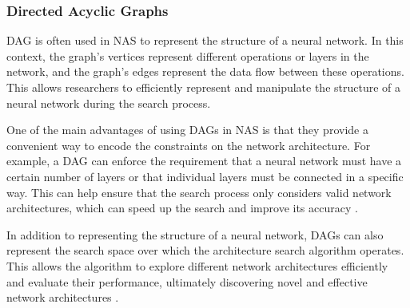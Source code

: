 \subsubsection{Directed Acyclic Graphs}
\Gls{DAG} is often used in \gls{NAS} to represent the structure of a neural network. In this context, the graph's vertices represent different operations or layers in the network, and the graph's edges represent the data flow between these operations. This allows researchers to efficiently represent and manipulate the structure of a neural network during the search process.

One of the main advantages of using \glspl{DAG} in \gls{NAS} is that they provide a convenient way to encode the constraints on the network architecture. For example, a \gls{DAG} can enforce the requirement that a neural network must have a certain number of layers or that individual layers must be connected in a specific way. This can help ensure that the search process only considers valid network architectures, which can speed up the search and improve its accuracy \autocite{https://doi.org/10.48550/arxiv.1806.09055}. 

In addition to representing the structure of a neural network, \glspl{DAG} can also represent the search space over which the architecture search algorithm operates. This allows the algorithm to explore different network architectures efficiently and evaluate their performance, ultimately discovering novel and effective network architectures \autocite{inproceedings}. 
